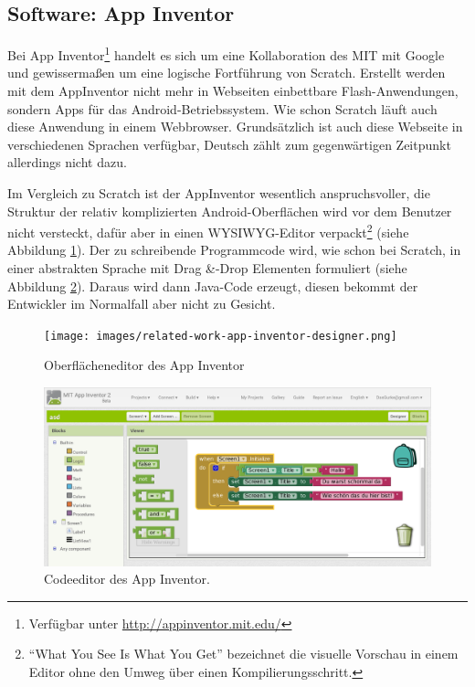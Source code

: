 \newpage

\subsection{Software: App Inventor}

Bei App Inventor\footnote{Verfügbar unter \url{http://appinventor.mit.edu/}} handelt es sich um eine Kollaboration des MIT mit Google und gewissermaßen um eine logische Fortführung von Scratch. Erstellt werden mit dem AppInventor nicht mehr in Webseiten einbettbare Flash-Anwendungen, sondern Apps für das Android-Betriebssystem. Wie schon Scratch läuft auch diese Anwendung in einem Webbrowser. Grundsätzlich ist auch diese Webseite in verschiedenen Sprachen verfügbar, Deutsch zählt zum gegenwärtigen Zeitpunkt allerdings nicht dazu.

Im Vergleich zu Scratch ist der AppInventor wesentlich anspruchsvoller, die Struktur der relativ komplizierten Android-Oberflächen wird vor dem Benutzer nicht versteckt, dafür aber in einen WYSIWYG-Editor verpackt\footnote{"`What You See Is What You Get"' bezeichnet die visuelle Vorschau in einem Editor ohne den Umweg über einen Kompilierungsschritt.} (siehe Abbildung \ref{fig:app-inventor-ui-designer}). Der zu schreibende Programmcode wird, wie schon bei Scratch, in einer abstrakten Sprache mit Drag \&-Drop Elementen formuliert (siehe Abbildung \ref{fig:app-inventor-block-designer}). Daraus wird dann Java-Code erzeugt, diesen bekommt der Entwickler im Normalfall aber nicht zu Gesicht.

\begin{figure}[h]
  \centering \texttt{[image: images/related-work-app-inventor-designer.png]}
  \caption{Oberflächeneditor des App Inventor}
  \label{fig:app-inventor-ui-designer}
\end{figure}

\begin{figure}[h]
  \centering \includegraphics[width=\textwidth]{images/related-work-app-inventor-blocks.png}
  \caption{Codeeditor des App Inventor.}
  \label{fig:app-inventor-block-designer}
\end{figure}

